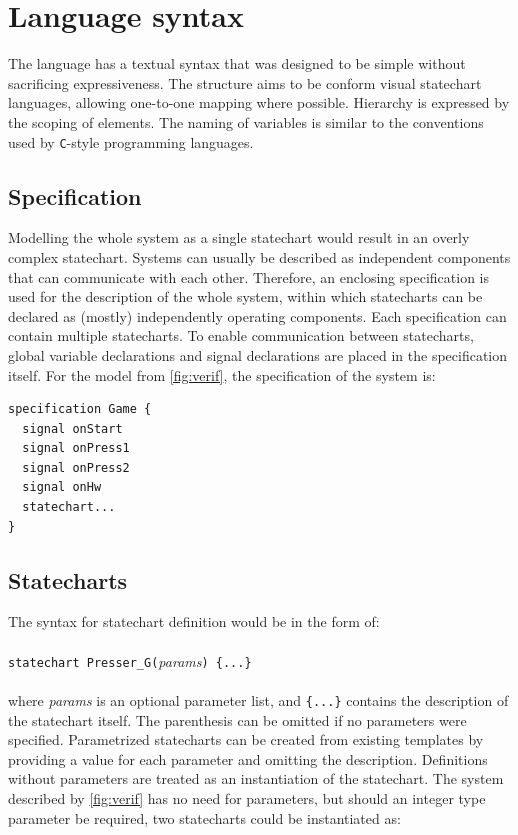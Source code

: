 \section{Language syntax}
The language has a textual syntax that was designed to be simple without sacrificing expressiveness. The structure aims to be conform visual statechart languages, allowing one-to-one mapping where possible. Hierarchy is expressed by the scoping of elements. The naming of variables is similar to the conventions used by \verb!C!-style programming languages.
  \subsection{Specification}
Modelling the whole system as a single statechart would result in an overly complex statechart. Systems can usually be described as independent components that can communicate with each other. Therefore, an enclosing specification is used for the description of the whole system, within which statecharts can be declared as (mostly) independently operating components. Each specification can contain multiple statecharts. To enable communication between statecharts, global variable declarations and signal declarations are placed in the specification itself. For the model from \cref{fig:verif}, the specification of the system is:

\begin{lstlisting}
specification Game {
  signal onStart
  signal onPress1
  signal onPress2
  signal onHw
  statechart...
}
\end{lstlisting}

  \subsection{Statecharts}
The syntax for statechart definition would be in the form of:
\\\\\verb!statechart Presser_G(!\textit{params}\verb!) {...}!\\\\
where \textit{params} is an optional parameter list, and \verb!{...}! contains the description of the statechart itself. The parenthesis can be omitted if no parameters were specified. Parametrized statecharts can be created from existing templates by providing a value for each parameter and omitting the description. Definitions without parameters are treated as an instantiation of the statechart. The system described by \cref{fig:verif} has no need for parameters, but should an integer type parameter be required, two statecharts could be instantiated as:


